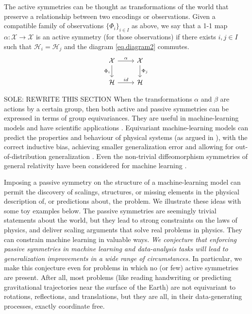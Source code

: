 \documentclass{article}
\theoremstyle{plain}
\theoremstyle{definition}
\theoremstyle{remark}
\newcommand{\bernhard}[1]{~B: \textcolor{red}{\textbf{#1}}}
\begin{document}
The active symmetries can be thought as transformations of the world that preserve a relationship between two encodings or observations. Given a compatible family of observations $\{\Phi_i\}_{i\in I}$ as above, we say that a 1-1 map $\alpha:\mathcal X \to \mathcal X$ is an active symmetry (for those observations) if there exists $i,j\in I$ such that $\mathcal H_i = \mathcal H_j$ and the diagram  \eqref{eq.diagram2} commutes. 
\begin{equation}\label{eq.diagram2}
\begin{tikzcd}[]
  {\cal X}\arrow[r,"\alpha"] \arrow[d,"\Phi_i",swap] & {\cal X}  \arrow[d,"\Phi_j"]\\
{\mathcal H} \arrow[r,"id"]  & {\mathcal H} 
\end{tikzcd}
\end{equation}



SOLE: REWRITE THIS SECTION
When the transformations $\alpha$ and $\beta$ are actions by a certain group, then both active and passive symmetries can be expressed in terms of group equivariances.
They are useful in machine-learning models \cite{cohen2016group, kondor2018convolution, thomas2018tensor, geiger2022e3nn, finzi2020generalizing, finzi2021practical} and have scientific applications \cite{batzner20223, musaelian2022learning, stark2022equibind, yu-physics, wang2022approximately}.
Equivariant machine-learning models can predict the properties and behaviour of physical systems (as argued in \cite{cheng2019covariance}), with the correct inductive bias, achieving smaller generalization error \cite{bietti2021sample, elesedy2021provably, elesedy2021kernel, mei2021learning} and allowing for out-of-distribution generalization \cite{villar2022dimensionless}. 
Even the non-trivial diffeomorphism symmetries of general relativity have been considered for machine learning \cite{weiler}.



Imposing a passive symmetry on the structure of a machine-learning model can permit the discovery of scalings, structures, or missing elements in the physical description of, or predictions about, the problem.
We illustrate these ideas with some toy examples below.
The passive symmetries are seemingly trivial statements about the world, but they lead to strong constraints on the laws of physics, and deliver scaling arguments that solve real problems in physics.
They can constrain machine learning in valuable ways.
\emph{We conjecture that enforcing passive symmetries in machine learning and data-analysis tasks will lead to generalization improvements in a wide range of circumstances.}
In particular, we make this conjecture even for problems in which no (or few) active symmetries are present.
After all, most problems (like reading handwriting or predicting gravitational trajectories near the surface of the Earth) are not equivariant to rotations, reflections, and translations, but they are all, in their data-generating processes, exactly coordinate free.
\end{document}
